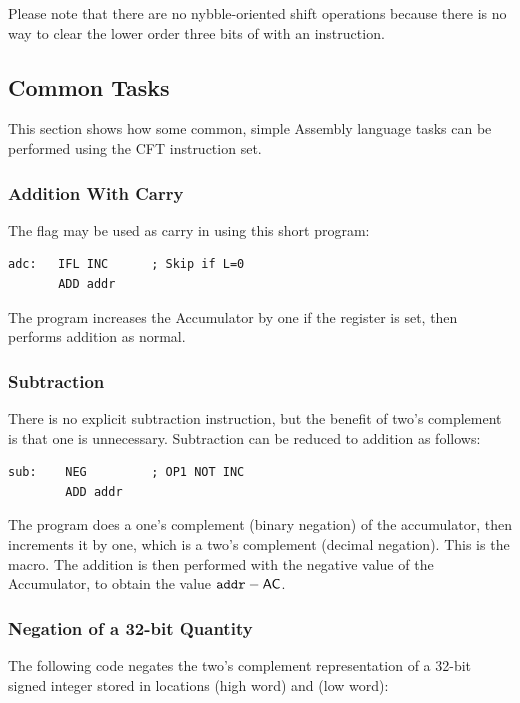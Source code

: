 Please note that there are no nybble-oriented shift operations because
there is no way to clear the lower order three bits of \A{} with an
 instruction.

\subsection{Common Tasks}

This section shows how some common, simple Assembly language tasks can
be performed using the CFT instruction set.

\subsubsection{Addition With Carry}

The \Lreg{} flag may be used as carry in using this short program:
\begin{lstlisting}[language=cftasm]
adc:   IFL INC      ; Skip if L=0
       ADD addr
\end{lstlisting}

The program increases the \gls{Accumulator} by one if the \Lreg{} register is set,
then performs addition as normal.

\subsubsection{Subtraction}

There is no explicit subtraction instruction, but the benefit of two's
complement is that one is unnecessary. Subtraction can be reduced to
addition as follows:

\begin{lstlisting}[language=cftasm]
sub:    NEG         ; OP1 NOT INC
        ADD addr
\end{lstlisting}

The program does a one's complement (binary negation) of the accumulator, then
increments it by one, which is a two's complement (decimal negation). This is
the  macro. The addition is then performed with the negative value of
the \gls{Accumulator}, to obtain the value $\mbox{\asm{addr}} - \mbox{\AC}$.

\subsubsection{Negation of a 32-bit Quantity}

The following code negates the two's complement representation of a
32-bit signed integer stored in locations  (high word) and
 (low word):

